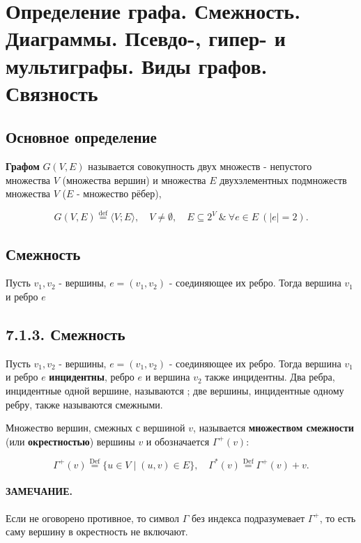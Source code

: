 {
	\section{Определение графа. Смежность. Диаграммы. Псевдо-, гипер- и мультиграфы. Виды
графов. Связность}

\subsection*{Основное определение}

\textbf{Графом} $G(V, E)$ называется совокупность двух множеств - непустого множества $V$ (множества вершин) и множества $E$ двухэлементных подмножеств множества $V$ ($E$ - множество рёбер),


\[
G(V, E) \overset{\text{def}}{=} \langle V; E \rangle,\quad V \neq \emptyset,\quad E \subseteq 2^V\ \&\ \forall e \in E\ (|e| = 2).
\]

\subsection*{Смежность}

Пусть $v_1, v_2$ - вершины, $e = (v_1, v_2)$ - соединяющее их ребро. Тогда вершина $v_1$ и ребро $e$ \subsection*{7.1.3. Смежность}

Пусть $v_1, v_2$ - вершины, $e = (v_1, v_2)$ - соединяющее их ребро. Тогда вершина $v_1$ и ребро $e$ \textbf{инцидентны}, ребро $e$ и вершина $v_2$ также инцидентны. Два ребра, инцидентные одной вершине, называются ; две вершины, инцидентные одному ребру, также называются смежными.

Множество вершин, смежных с вершиной $v$, называется \textbf{множеством смежности} (или \textbf{окрестностью}) вершины $v$ и обозначается $\Gamma^+(v)$:


\[
\Gamma^+(v) \overset{\text{Def}}{=} \{ u \in V \mid (u, v) \in E \}, \quad \Gamma^*(v) \overset{\text{Def}}{=} \Gamma^+(v) + v.
\]



\paragraph{ЗАМЕЧАНИЕ.}
Если не оговорено противное, то символ $\Gamma$ без индекса подразумевает $\Gamma^+$, то есть саму вершину в окрестность не включают. \\

}
